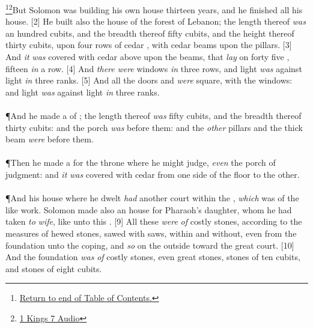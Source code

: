 \footnote{\textcolor[cmyk]{0.99998,1,0,0}{\hyperlink{TOC}{Return to end of Table of Contents.}}}\footnote{\href{https://audiobible.com/bible/1_kings_7.html}{\textcolor[cmyk]{0.99998,1,0,0}{1 Kings 7 Audio}}}\textcolor[cmyk]{0.99998,1,0,0}{But Solomon was building his own house thirteen years, and he finished all his house.}
[2] \textcolor[cmyk]{0.99998,1,0,0}{He built also the house of the forest of Lebanon; the length thereof \emph{was} an hundred cubits, and the breadth thereof fifty cubits, and the height thereof thirty cubits, upon four rows of cedar , with cedar beams upon the pillars.}
[3] \textcolor[cmyk]{0.99998,1,0,0}{And \emph{it} \emph{was} covered with cedar above upon the beams, that \emph{lay} on forty five , fifteen \emph{in} a row.}
[4] \textcolor[cmyk]{0.99998,1,0,0}{And \emph{there} \emph{were} windows \emph{in} three rows, and light \emph{was} against light \emph{in} three ranks.}
[5] \textcolor[cmyk]{0.99998,1,0,0}{And all the doors and  \emph{were} square, with the windows: and light \emph{was} against light \emph{in} three ranks.}\\
\\
\P \textcolor[cmyk]{0.99998,1,0,0}{And he made a  of ; the length thereof \emph{was} fifty cubits, and the breadth thereof thirty cubits: and the porch \emph{was} before them: and the \emph{other} pillars and the thick beam \emph{were} before them.}\\
\\
\P \textcolor[cmyk]{0.99998,1,0,0}{Then he made a  for the throne where he might judge, \emph{even} the porch of judgment: and \emph{it} \emph{was} covered with cedar from one side of the floor to the other.}\\
\\
\P \textcolor[cmyk]{0.99998,1,0,0}{And his house where he dwelt \emph{had} another court within the , \emph{which} was of the like work. Solomon made also an house for Pharaoh's daughter, whom he had taken \emph{to} \emph{wife}, like unto this .}
[9] \textcolor[cmyk]{0.99998,1,0,0}{All these \emph{were} \emph{of} costly stones, according to the measures of hewed stones, sawed with saws, within and without, even from the foundation unto the coping, and \emph{so} on the outside toward the great court.}
[10] \textcolor[cmyk]{0.99998,1,0,0}{And the foundation \emph{was} \emph{of} costly stones, even great stones, stones of ten cubits, and stones of eight cubits.}
